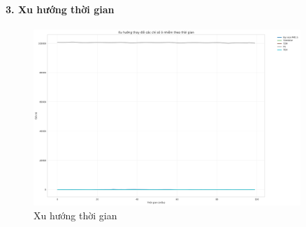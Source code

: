 \documentclass[12pt,a4paper]{article}
\begin{document}
\paragraph{3. Xu hướng thời gian}

\begin{figure}[H]
\centering
\includegraphics[width=0.9\textwidth]{results_comb_PM25_Hanoi_2018_sm_20251011_121424/20251011_121424_xu_huong_thoi_gian.png}
\caption{Xu hướng thời gian}
\end{figure}
\end{document}
